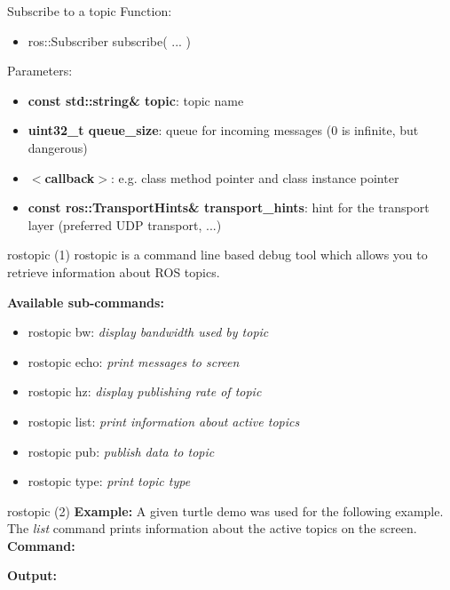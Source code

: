 \documentclass{beamer}
\begin{document}
\begin{frame}{Subscribe to a topic}
	Function:
	\begin{itemize}
		\item ros::Subscriber subscribe( ... )
	\end{itemize}
	Parameters:
	\begin{itemize}
		\item \textbf{const std::string\& topic}: topic name
		\item \textbf{uint32\_t queue\_size}: queue for incoming messages (0 is infinite, but dangerous)
		\item \textbf{$<$callback$>$}: e.g. class method pointer and class instance pointer
		\item \textbf{const ros::TransportHints\& transport\_hints}: hint for the transport layer (preferred UDP transport, ...)
	\end{itemize}
\end{frame}
\begin{frame}{rostopic (1)}
	rostopic is a command line based debug tool which allows you to retrieve information about ROS topics.
	\newline
	\newline
	\begin{large}\textbf{Available sub-commands:}\end{large}
	\begin{itemize}
		\item rostopic bw:     \textit{display bandwidth used by topic}
		\item rostopic echo:   \textit{print messages to screen}
		\item rostopic hz:     \textit{display publishing rate of topic}    
		\item rostopic list:   \textit{print information about active topics}
		\item rostopic pub:    \textit{publish data to topic}
		\item rostopic type:   \textit{print topic type}
	\end{itemize}
\end{frame}
\begin{frame}{rostopic (2)}
	\textbf{Example:} A given turtle demo was used for the following example.
	\newline
	The \textit{list} command prints information about the active topics on the screen.
	\newline
	\textbf{Command:} 
	
	
	
	\textbf{Output:}
	
	
\end{frame}
\end{document}
